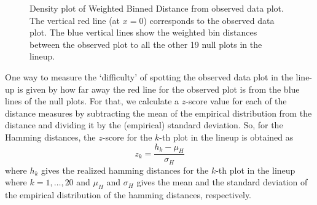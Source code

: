 \begin{figure}[hbtp]
   \centering
	\vspace{-.1in}
       \caption{Density plot of Weighted Binned Distance from observed data plot.  The vertical red line (at $x=0$)  corresponds to the observed data plot. The blue vertical lines show the weighted bin distances between the observed plot to all the other 19 null plots in the lineup.  }
       \label{emp_wbdist}
\end{figure}

One way to measure the `difficulty' of spotting the observed data plot in the line-up is given by how far away the red line for the observed plot is from the blue lines of the null plots. For that, 
we calculate a $z$-score value for each of the distance measures by subtracting the mean of the empirical distribution from the distance %
and dividing it by the (empirical) standard deviation. 
So, for the Hamming distances,  the $z$-score for the $k$-th plot in the lineup is obtained as 
\[
z_k = \frac{h_k - \mu_H}{\sigma_H}
\]
where $h_k$ gives the realized hamming distances for the $k$-th plot in the lineup where $k = 1, \dots, 20$ and $\mu_H$ and $\sigma_H$ gives the mean and the standard deviation of the empirical distribution of the hamming distances, respectively. 

